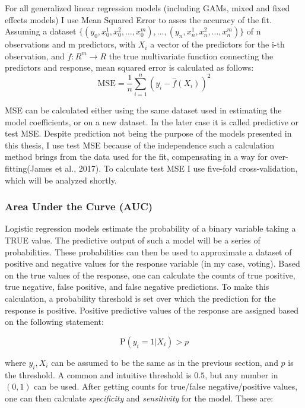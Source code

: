 \documentclass[12pt,twoside]{reedthesis}
\begin{document}
  For all generalized linear regression models (including GAMs, mixed and
  fixed effects models) I use Mean Squared Error to asses the accuracy of
  the fit. Assuming a dataset
  \(\{(y_0, x_0^1, x_0^2, ..., x_0^m),...,(y_n, x_n^1, x_n^2, ..., x_n^m)\}\)
  of n observations and m predictors, with \(X_i\) a vector of the
  predictors for the i-th observation, and \(f:R^m \to R\) the true
  multivariate function connecting the predictors and response, mean
  squared error is calculated as follows:
  \[\text{MSE} = \frac{1}{n}\sum_{i=1}^{n}(y_i - \hat{f}(X_i))^2\]
  
  MSE can be calculated either using the same dataset used in estimating
  the model coefficients, or on a new dataset. In the later case it is
  called predictive or test MSE. Despite prediction not being the purpose
  of the models presented in this thesis, I use test MSE because of the
  independence such a calculation method brings from the data used for the
  fit, compensating in a way for over-fitting(James et al., 2017). To
  calculate test MSE I use five-fold cross-validation, which will be
  analyzed shortly.
  
  \subsubsection{Area Under the Curve
  (AUC)}\label{area-under-the-curve-auc}
  
  Logistic regression models estimate the probability of a binary variable
  taking a TRUE value. The predictive output of such a model will be a
  series of probabilities. These probabilities can then be used to
  approximate a dataset of positive and negative values for the response
  variable (in my case, voting). Based on the true values of the response,
  one can calculate the counts of true positive, true negative, false
  positive, and false negative predictions. To make this calculation, a
  probability threshold is set over which the prediction for the response
  is positive. Positive predictive values of the response are assigned
  based on the following statement:
  
  \[\text{P}(y_i = 1|X_i) > p\]
  
  where \(y_i, X_i\) can be assumed to be the same as in the previous
  section, and \(p\) is the threshold. A common and intuitive threshold is
  \(0.5\), but any number in \((0,1)\) can be used. After getting counts
  for true/false negative/positive values, one can then calculate
  \emph{specificity} and \emph{sensitivity} for the model. These are:
  
\end{document}
